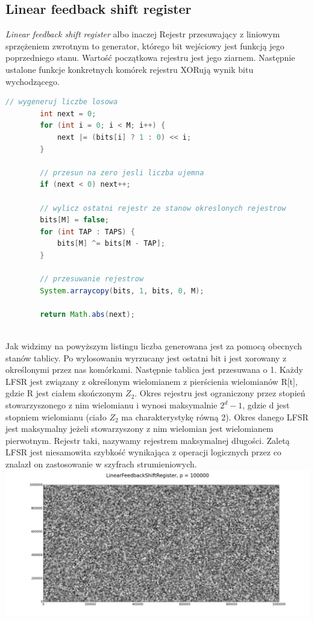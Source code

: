 \documentclass[a4paper, 11pt]{article} %
\begin{document}
\subsection{Linear feedback shift register}
\textit{Linear feedback shift register} albo inaczej Rejestr przesuwający z liniowym sprzężeniem zwrotnym to generator, którego bit wejściowy jest funkcją jego poprzedniego stanu. Wartość początkowa rejestru jest jego ziarnem. Następnie ustalone funkcje konkretnych komórek rejestru XORują wynik bitu wychodzącego.
\begin{lstlisting}[style=mystyle, language=java, frame=single, caption = generowanie liczby za pomocą LFSR i przesuwanie komórek.] 
        // wygeneruj liczbe losowa
        int next = 0;
        for (int i = 0; i < M; i++) {
            next |= (bits[i] ? 1 : 0) << i;
        }

        // przesun na zero jesli liczba ujemna
        if (next < 0) next++;

        // wylicz ostatni rejestr ze stanow okreslonych rejestrow
        bits[M] = false;
        for (int TAP : TAPS) {
            bits[M] ^= bits[M - TAP];
        }

        // przesuwanie rejestrow
        System.arraycopy(bits, 1, bits, 0, M);

        return Math.abs(next);
    
\end{lstlisting}
Jak widzimy na powyższym listingu liczba generowana jest za pomocą obecnych stanów tablicy. Po wylosowaniu wyrzucany jest ostatni bit i jest xorowany z określonymi przez nas komórkami. Następnie tablica jest przesuwana o 1. \newline
Każdy LFSR jest związany z określonym wielomianem z pierścienia wielomianów R[t], gdzie R jest ciałem skończonym $Z_2$.
Okres rejestru jest ograniczony przez stopień stowarzyszonego z nim wielomianu i wynosi maksymalnie $2^d - 1$, gdzie d jest stopniem wielomianu (ciało ${Z}_2$ ma charakterystykę równą 2). Okres danego LFSR jest maksymalny jeżeli stowarzyszony z nim wielomian jest wielomianem pierwotnym. Rejestr taki, nazywamy rejestrem maksymalnej długości.
\newline Zaletą LFSR jest niesamowita szybkość wynikająca z operacji logicznych przez co znalazł on zastosowanie w szyfrach strumieniowych.\\
\includegraphics[width=\linewidth]{img/lfsr-1.png}
\end{document}
